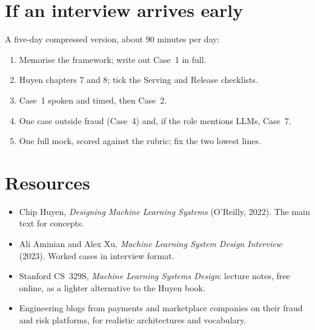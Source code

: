 \documentclass[10pt,a4paper]{article}
\begin{document}
\section{If an interview arrives early}

A five-day compressed version, about 90 minutes per day:

\begin{enumerate}
  \item Memorise the framework; write out Case~1 in full.
  \item Huyen chapters 7 and 8; tick the Serving and Release checklists.
  \item Case~1 spoken and timed, then Case~2.
  \item One case outside fraud (Case~4) and, if the role mentions LLMs,
    Case~7.
  \item One full mock, scored against the rubric; fix the two lowest lines.
\end{enumerate}

\section{Resources}

\begin{itemize}
  \item Chip Huyen, \emph{Designing Machine Learning Systems} (O'Reilly, 2022).
    The main text for concepts.
  \item Ali Aminian and Alex Xu, \emph{Machine Learning System Design
    Interview} (2023). Worked cases in interview format.
  \item Stanford CS~329S, \emph{Machine Learning Systems Design}: lecture
    notes, free online, as a lighter alternative to the Huyen book.
  \item Engineering blogs from payments and marketplace companies on their
    fraud and risk platforms, for realistic architectures and vocabulary.
\end{itemize}
\end{document}
